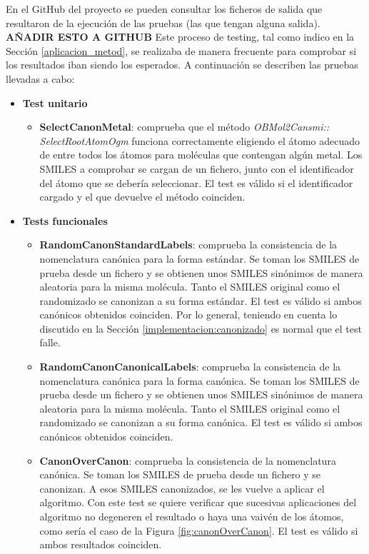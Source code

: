 En el GitHub del proyecto se pueden consultar los ficheros de salida que resultaron de la ejecución de las pruebas (las que tengan alguna salida). \textbf{AÑADIR ESTO A GITHUB}
Este proceso de testing, tal como indico en la Sección \ref{aplicacion_metod}, se realizaba de manera frecuente para comprobar si los resultados iban siendo los esperados. A continuación se describen las pruebas llevadas a cabo:

\begin{itemize}
    \item \textbf{Test unitario}
    \begin{itemize}
        \item \textbf{SelectCanonMetal}: comprueba que el método \textit{OBMol2Cansmi:: SelectRootAtomOgm} funciona correctamente eligiendo el átomo adecuado de entre todos los átomos para moléculas que contengan algún metal. Los SMILES a comprobar se cargan de un fichero, junto con el identificador del átomo que se debería seleccionar. El test es válido si el identificador cargado y el que devuelve el método coinciden.
    \end{itemize}

    \item \textbf{Tests funcionales}
    \begin{itemize}
        \item \textbf{RandomCanonStandardLabels}: comprueba la consistencia de la nomenclatura canónica para la forma estándar. Se toman los SMILES de prueba desde un fichero y se obtienen unos SMILES sinónimos de manera aleatoria para la misma molécula. Tanto el SMILES original como el randomizado se canonizan a su forma estándar. El test es válido si ambos canónicos obtenidos coinciden. Por lo general, teniendo en cuenta lo discutido en la Sección \ref{implementacion:canonizado} es normal que el test falle.

        \item \textbf{RandomCanonCanonicalLabels}: comprueba la consistencia de la nomenclatura canónica para la forma canónica. Se toman los SMILES de prueba desde un fichero y se obtienen unos SMILES sinónimos de manera aleatoria para la misma molécula. Tanto el SMILES original como el randomizado se canonizan a su forma canónica. El test es válido si ambos canónicos obtenidos coinciden.
    
        \item \textbf{CanonOverCanon}: comprueba la consistencia de la nomenclatura canónica. Se toman los SMILES de prueba desde un fichero y se canonizan. A esos SMILES canonizados, se les vuelve a aplicar el algoritmo. Con este test se quiere verificar que sucesivas aplicaciones del algoritmo no degeneren el resultado o haya una vaivén de los átomos, como sería el caso de la Figura \ref{fig:canonOverCanon}. El test es válido si ambos resultados coinciden.


\end{itemize}
\end{itemize}
